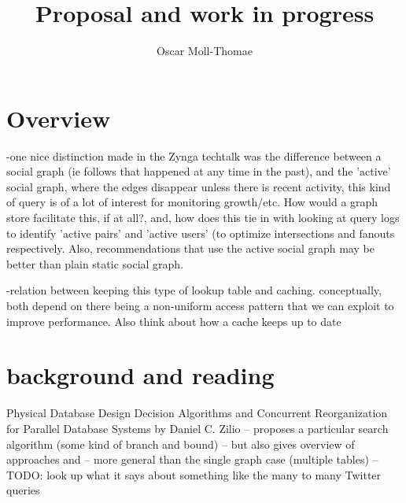 \documentclass{article}
\author{Oscar Moll-Thomae}
\title{Proposal and work in progress}
\begin{document}
\maketitle


\newcommand{\code}{\ttfamily}
\newcommand{\draftnote}[2][inline]{\todo[#1]{{\bf NOTE:} #2}}
\newcommand{\todonote}[2][inline]{\todo[#1]{{\bf TODO:} #2}}

\newcommand{\edgeq}{{\code getEdge()}}
\newcommand{\fanoutq}[1][]{{\code getFanout(}~#1~{\code )}}
\newcommand{\intersectq}{{\code getIntersection()}}
\newcommand{\randomwalk}{{\code randomWalk()}}



\section{Overview}

-one nice distinction made in the Zynga techtalk was the difference between a social graph (ie follows that happened at any time in the past), and the 'active' social graph, where the edges disappear unless there is recent activity, this kind of query is of a lot of interest for monitoring growth/etc. How would a graph store facilitate this, if at all?, and, how does this tie in with looking at query logs to identify 'active pairs' and 'active users' (to optimize intersections and fanouts respectively. Also, recommendations that use the active social graph may be better than plain static social graph.

-relation between keeping this type of lookup table and caching. conceptually, both depend on there being a non-uniform access pattern that we can exploit to improve performance. Also think about how a cache keeps up to date

\section{background and reading}

Physical Database Design Decision Algorithms and
Concurrent Reorganization for
Parallel Database Systems
by
Daniel C. Zilio -- proposes a particular search algorithm (some kind of branch and bound)
-- but also gives overview of approaches and 
-- more general than the single graph case (multiple tables)
--TODO: look up what it says about something like the many to many Twitter queries
\end{document}
